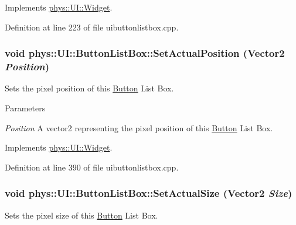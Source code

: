 Implements \hyperlink{classphys_1_1UI_1_1Widget_aaf1a1bd31b8e626467ce9cdb69bdf7ac}{phys::UI::Widget}.



Definition at line 223 of file uibuttonlistbox.cpp.

\hypertarget{classphys_1_1UI_1_1ButtonListBox_a84547b5097342c7edf12a407a4208352}{
\subsubsection[{SetActualPosition}]{\setlength{\rightskip}{0pt plus 5cm}void phys::UI::ButtonListBox::SetActualPosition ({\bf Vector2} {\em Position})}}
\label{d4/dd7/classphys_1_1UI_1_1ButtonListBox_a84547b5097342c7edf12a407a4208352}


Sets the pixel position of this \hyperlink{classphys_1_1UI_1_1Button}{Button} List Box. 


\begin{DoxyParams}{Parameters}
\item[{\em Position}]A vector2 representing the pixel position of this \hyperlink{classphys_1_1UI_1_1Button}{Button} List Box. \end{DoxyParams}


Implements \hyperlink{classphys_1_1UI_1_1Widget_ac8f70c390e7724e57fc99e51d8004a9b}{phys::UI::Widget}.



Definition at line 390 of file uibuttonlistbox.cpp.

\hypertarget{classphys_1_1UI_1_1ButtonListBox_affb1419eac8fd0818c6afabf4ee21065}{
\subsubsection[{SetActualSize}]{\setlength{\rightskip}{0pt plus 5cm}void phys::UI::ButtonListBox::SetActualSize ({\bf Vector2} {\em Size})}}
\label{d4/dd7/classphys_1_1UI_1_1ButtonListBox_affb1419eac8fd0818c6afabf4ee21065}


Sets the pixel size of this \hyperlink{classphys_1_1UI_1_1Button}{Button} List Box. 


